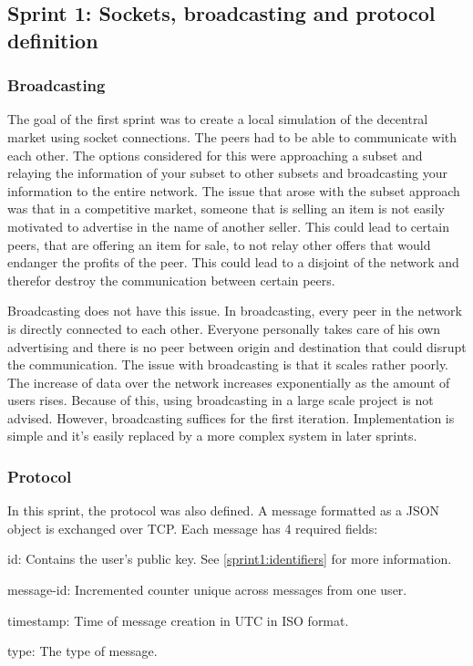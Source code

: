 \subsection{Sprint 1: Sockets, broadcasting and protocol definition}
\subsubsection{Broadcasting}
The goal of the first sprint was to create a local simulation of the decentral market using socket connections.
The peers had to be able to communicate with each other.
The options considered for this were approaching a subset and relaying the information of your subset to other subsets and broadcasting your information to the entire network.
The issue that arose with the subset approach was that in a competitive market, someone that is selling an item is not easily motivated to advertise in the name of another seller.
This could lead to certain peers, that are offering an item for sale, to not relay other offers that would endanger the profits of the peer.
This could lead to a disjoint of the network and therefor destroy the communication between certain peers.

Broadcasting does not have this issue.
In broadcasting, every peer in the network is directly connected to each other.
Everyone personally takes care of his own advertising and there is no peer between origin and destination that could disrupt the communication.
The issue with broadcasting is that it scales rather poorly.
The increase of data over the network increases exponentially as the amount of users rises.
Because of this, using broadcasting in a large scale project is not advised.
However, broadcasting suffices for the first iteration.
Implementation is simple and it's easily replaced by a more complex system in later sprints.

\subsubsection{Protocol}

In this sprint, the protocol was also defined.
A message formatted as a JSON object is exchanged over TCP.
Each message has 4 required fields:
\begin{myitemize}
\item id: Contains the user's public key. See \ref{sprint1:identifiers} for more information.
\item message-id: Incremented counter unique across messages from one user.
\item timestamp: Time of message creation in UTC in ISO format.
\item type: The type of message.
\end{myitemize}

